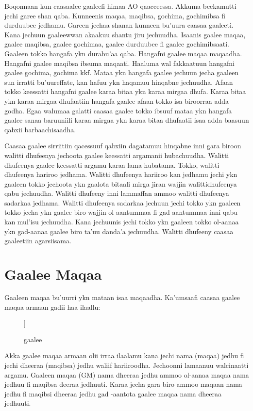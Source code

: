 \documentclass[11pt,b5paper]{book}
\begin{document}
Boqonnaan kun caasaalee gaaleefi himaa AO qaacceessa. Akkuma beekamutti jechi garee shan qaba. Kunneenis maqaa, maqibsa, gochima, gochimibsa fi durduubee jedhamu. Gareen jechaa shanan kunneen bu’uura caasaa gaaleeti. Kana jechuun gaaleewwan akaakuu shantu jiru jechuudha. Isaanis gaalee maqaa, gaalee maqibsa, gaalee gochimaa, gaalee durduubee fi gaalee gochimibsaati. Gaaleen tokko hangafa ykn durabu’aa qaba. Hangafni gaalee maqaa maqaadha. Hangafni gaalee maqibsa ibsuma maqaati. Haaluma wal fakkaatuun hangafni gaalee gochima, gochima kkf. Mataa ykn hangafa gaalee jechuun jecha gaaleen sun irratti bu’uureffate, kan hafuu ykn haqamuu hinqabne jechuudha. Afaan tokko keessatti hangafni gaalee karaa bitaa ykn karaa mirgaa dhufa. Karaa bitaa ykn karaa mirgaa dhufaatiin hangafa gaalee afaan tokko isa biroorraa adda godha. Egaa walumaa galatti caasaa gaalee tokko ibsuuf mataa ykn hangafa gaalee sanaa baruuniifi karaa mirgaa ykn karaa bitaa dhufaatii isaa adda baasuun qabxii barbaachisaadha.

Caasaa gaalee sirriitiin qacessuuf qabxiin dagatamuu hinqabne inni gara biroon walitti dhufeenya jechoota gaalee keessatti argamanii hubachuudha. Walitti dhufeenya gaalee keessatti argamu karaa lama hubatama. Tokko, walitti dhufeenya hariroo jedhama. Walitti dhufeenya hariiroo kan jedhamu jechi ykn gaaleen tokko jechoota ykn gaalota bitaafi mirga jiran wajjin walittidhufeenya qabu jechuudha. Walitti dhufeeny inni lammaffan ammoo walitti dhufeenya sadarkaa jedhama. Walitti dhufeenya sadarkaa jechuun jechi tokko ykn gaaleen tokko
jecha ykn gaalee biro wajjin ol-aantummaa fi gad-aantummaa inni qabu kan mul’isu jechuudha. Kana jechuunis jechi tokko ykn gaaleen tokko ol-aanaa ykn gad-aanaa gaalee biro ta’uu danda’a jechuudha. Walitti dhufeeny caasaa gaaleetiin agarsiisama. 

\section{Gaalee Maqaa}
Gaaleen maqaa bu'uurri ykn mataan isaa maqaadha. Ka'umsaafi caasaa gaalee maqaa armaan gadii haa ilaallu:\\

\begin{figure}[H]
	\caption{gaalee}
	\centering
	\begin{forest}
		[GM \\ nama dheeraa
			[M\\nama]
			[IM\\dheeraa]
		]
	\end{forest}
\end{figure}
Akka gaalee maqaa armaan olii irraa ilaalamu kana jechi nama (maqaa) jedhu fi jechi dheeraa (maqibsa) jedhu waliif
hariiroodha. Jechoonni lamaanuu walcinaatti argamu. Gaaleen maqaa (GM) nama dheeraa jedhu ammoo ol-aanaa maqaa
nama jedhuu fi maqibsa deeraa jedhuuti. Karaa jecha gara biro ammoo maqaan nama jedhu fi maqibsi dheeraa jedhu gad
-aantota gaalee maqaa nama dheeraa jedhuuti.
\end{document}
